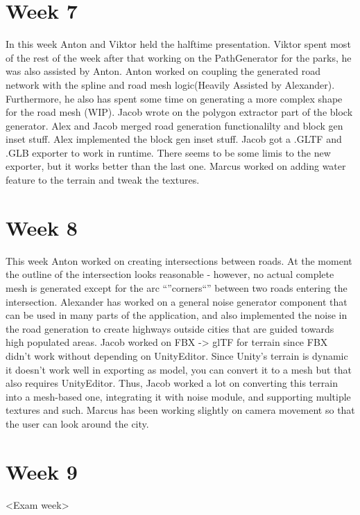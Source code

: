 \documentclass[11pt]{article}
\begin{document}
\section*{Week 7}
\label{sec:orgca7ff6c}
In this week Anton and Viktor held the halftime presentation. Viktor spent most
of the rest of the week after that working on the PathGenerator for the parks,
he was also assisted by Anton. Anton worked on coupling the generated road
network with the spline and road mesh logic(Heavily Assisted by Alexander).
Furthermore, he also has spent some time on generating a more complex shape for
the road mesh (WIP). Jacob wrote on the polygon extractor part of the block
generator. Alex and Jacob merged road generation functionalilty and block gen
inset stuff. Alex implemented the block gen inset stuff. Jacob got a .GLTF and
.GLB exporter to work in runtime. There seems to be some limis to the new
exporter, but it works better than the last one. Marcus worked on adding water
feature to the terrain and tweak the textures.

\section*{Week 8}
\label{sec:orge189878}
This week Anton worked on creating intersections between roads. At the moment
the outline of the intersection looks reasonable - however, no actual complete
mesh is generated except for the arc ``''corners``'' between two roads entering the
intersection.
Alexander has worked on a general noise generator component that can be used in
many parts of the application, and also implemented the noise in the road
generation to create highways outside cities that are guided towards high
populated areas.
Jacob worked on FBX -> glTF for terrain since FBX didn't work without depending
on UnityEditor. Since Unity's terrain is dynamic it doesn't work well in
exporting as model, you can convert it to a mesh but that also requires
UnityEditor. Thus, Jacob worked a lot on converting this terrain into a
mesh-based one, integrating it with noise module, and supporting multiple
textures and such.
Marcus has been working slightly on camera movement so that the user can look
around the city.

\section*{Week 9}
\label{sec:org899bfec}
<Exam week>
\end{document}
